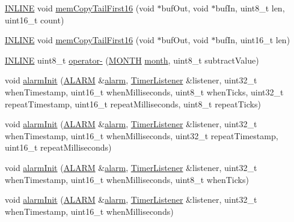 \begin{DoxyCompactItemize}
\item 
\hyperlink{io_8h_a2eb6f9e0395b47b8d5e3eeae4fe0c116}{I\-N\-L\-I\-N\-E} void \hyperlink{namespacemhvlib_a4feb6b26d74bfc4976b3cadad32bcb26}{mem\-Copy\-Tail\-First16} (void $\ast$buf\-Out, void $\ast$buf\-In, uint8\-\_\-t len, uint16\-\_\-t count)
\item 
\hyperlink{io_8h_a2eb6f9e0395b47b8d5e3eeae4fe0c116}{I\-N\-L\-I\-N\-E} void \hyperlink{namespacemhvlib_af54cc65a0f9af60efe2fc27151581ecc}{mem\-Copy\-Tail\-First16} (void $\ast$buf\-Out, void $\ast$buf\-In, uint16\-\_\-t len)
\item 
\hyperlink{io_8h_a2eb6f9e0395b47b8d5e3eeae4fe0c116}{I\-N\-L\-I\-N\-E} uint8\-\_\-t \hyperlink{namespacemhvlib_a7205bb572ec5d2b6382aa265569f2f6b}{operator-\/} (\hyperlink{namespacemhvlib_a2406fef93804eb87fef77054c6a2082c}{M\-O\-N\-T\-H} \hyperlink{namespacemhvlib_ab6dc87074774414e8c185a46c7db18c3}{month}, uint8\-\_\-t subtract\-Value)
\item 
void \hyperlink{namespacemhvlib_a0600ac3ecfb070ca4ea6e1d934369405}{alarm\-Init} (\hyperlink{namespacemhvlib_a3fa96bbaa152dfe112dd50663d5caef5}{A\-L\-A\-R\-M} \&\hyperlink{structmhvlib_1_1alarm}{alarm}, \hyperlink{classmhvlib_1_1_timer_listener}{Timer\-Listener} \&listener, uint32\-\_\-t when\-Timestamp, uint16\-\_\-t when\-Milliseconds, uint8\-\_\-t when\-Ticks, uint32\-\_\-t repeat\-Timestamp, uint16\-\_\-t repeat\-Milliseconds, uint8\-\_\-t repeat\-Ticks)
\item 
void \hyperlink{namespacemhvlib_aecfd7df3e01dd60e1a2e158904151ebe}{alarm\-Init} (\hyperlink{namespacemhvlib_a3fa96bbaa152dfe112dd50663d5caef5}{A\-L\-A\-R\-M} \&\hyperlink{structmhvlib_1_1alarm}{alarm}, \hyperlink{classmhvlib_1_1_timer_listener}{Timer\-Listener} \&listener, uint32\-\_\-t when\-Timestamp, uint16\-\_\-t when\-Milliseconds, uint32\-\_\-t repeat\-Timestamp, uint16\-\_\-t repeat\-Milliseconds)
\item 
void \hyperlink{namespacemhvlib_a86f58414271721f41ad97c7c496f506b}{alarm\-Init} (\hyperlink{namespacemhvlib_a3fa96bbaa152dfe112dd50663d5caef5}{A\-L\-A\-R\-M} \&\hyperlink{structmhvlib_1_1alarm}{alarm}, \hyperlink{classmhvlib_1_1_timer_listener}{Timer\-Listener} \&listener, uint32\-\_\-t when\-Timestamp, uint16\-\_\-t when\-Milliseconds, uint8\-\_\-t when\-Ticks)
\item 
void \hyperlink{namespacemhvlib_a0d93198b25c028dd09e109b2342bad4c}{alarm\-Init} (\hyperlink{namespacemhvlib_a3fa96bbaa152dfe112dd50663d5caef5}{A\-L\-A\-R\-M} \&\hyperlink{structmhvlib_1_1alarm}{alarm}, \hyperlink{classmhvlib_1_1_timer_listener}{Timer\-Listener} \&listener, uint32\-\_\-t when\-Timestamp, uint16\-\_\-t when\-Milliseconds)

\end{DoxyCompactItemize}
